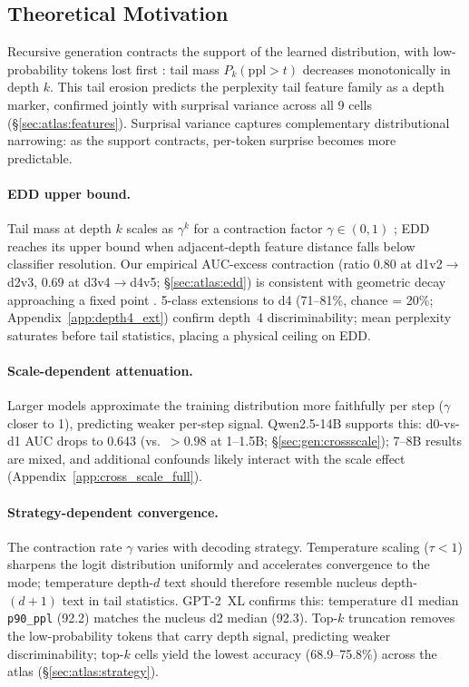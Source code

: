 \subsection{Theoretical Motivation}
\label{sec:method:theory}

Recursive generation contracts the support of the learned distribution, with low-probability tokens lost first \cite{shumailov2024_nature}: tail mass $P_k(\mathrm{ppl} > t)$ decreases monotonically in depth $k$.
This tail erosion predicts the perplexity tail feature family as a depth marker, confirmed jointly with surprisal variance across all 9 cells (\S\ref{sec:atlas:features}).
Surprisal variance captures complementary distributional narrowing: as the support contracts, per-token surprise becomes more predictable.

\paragraph{EDD upper bound.}
Tail mass at depth $k$ scales as $\gamma^k$ for a contraction factor $\gamma \in (0,1)$ \cite{dohmatob2024_tale_of_tails}; EDD reaches its upper bound when adjacent-depth feature distance falls below classifier resolution.
Our empirical AUC-excess contraction (ratio 0.80 at d1v2$\to$d2v3, 0.69 at d3v4$\to$d4v5; \S\ref{sec:atlas:edd}) is consistent with geometric decay approaching a fixed point \cite{bertrand2024_stability}.
5-class extensions to d4 (71--81\%, chance = 20\%; Appendix~\ref{app:depth4_ext}) confirm depth~4 discriminability; mean perplexity saturates before tail statistics, placing a physical ceiling on EDD.

\paragraph{Scale-dependent attenuation.}
Larger models approximate the training distribution more faithfully per step ($\gamma$ closer to 1), predicting weaker per-step signal.
Qwen2.5-14B supports this: d0-vs-d1 AUC drops to 0.643 (vs.\ ${>}0.98$ at 1--1.5B; \S\ref{sec:gen:crossscale}); 7--8B results are mixed, and additional confounds likely interact with the scale effect (Appendix~\ref{app:cross_scale_full}).

\paragraph{Strategy-dependent convergence.}
The contraction rate $\gamma$ varies with decoding strategy.
Temperature scaling ($\tau < 1$) sharpens the logit distribution uniformly and accelerates convergence to the mode; temperature depth-$d$ text should therefore resemble nucleus depth-$(d{+}1)$ text in tail statistics.
GPT-2~XL confirms this: temperature d1 median \texttt{p90\_ppl} (92.2) matches the nucleus d2 median (92.3).
Top-$k$ truncation removes the low-probability tokens that carry depth signal, predicting weaker discriminability; top-$k$ cells yield the lowest accuracy (68.9--75.8\%) across the atlas (\S\ref{sec:atlas:strategy}).
